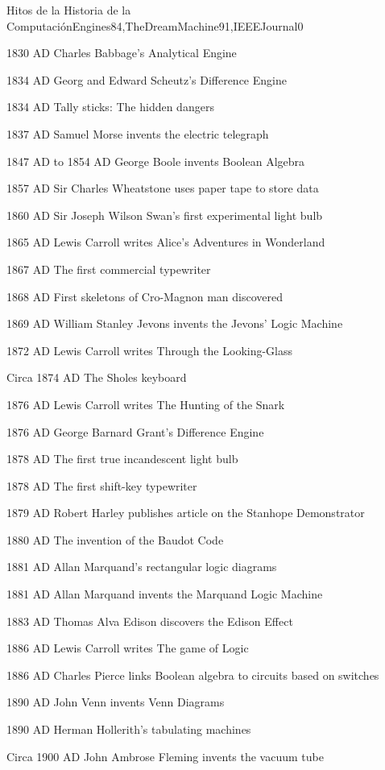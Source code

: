 \begin{syllabus}
\begin{unit}{Hitos de la Historia de la Computación}{Engines84,TheDreamMachine91,IEEEJournal}{0}
\begin{topics}
	\item 1830 AD Charles Babbage's Analytical Engine
	\item 1834 AD Georg and Edward Scheutz's Difference Engine
	\item 1834 AD Tally sticks: The hidden dangers
	\item 1837 AD Samuel Morse invents the electric telegraph
	\item 1847 AD to 1854 AD George Boole invents Boolean Algebra
	\item 1857 AD Sir Charles Wheatstone uses paper tape to store data
	\item 1860 AD Sir Joseph Wilson Swan's first experimental light bulb
	\item 1865 AD Lewis Carroll writes Alice's Adventures in Wonderland
	\item 1867 AD The first commercial typewriter
	\item 1868 AD First skeletons of Cro-Magnon man discovered
	\item 1869 AD William Stanley Jevons invents the Jevons' Logic Machine
	\item 1872 AD Lewis Carroll writes Through the Looking-Glass
	\item Circa 1874 AD The Sholes keyboard
	\item 1876 AD Lewis Carroll writes The Hunting of the Snark
	\item 1876 AD George Barnard Grant's Difference Engine
	\item 1878 AD The first true incandescent light bulb
	\item 1878 AD The first shift-key typewriter
	\item 1879 AD Robert Harley publishes article on the Stanhope Demonstrator
	\item 1880 AD The invention of the Baudot Code
	\item 1881 AD Allan Marquand's rectangular logic diagrams
	\item 1881 AD Allan Marquand invents the Marquand Logic Machine
	\item 1883 AD Thomas Alva Edison discovers the Edison Effect
	\item 1886 AD Lewis Carroll writes The game of Logic
	\item 1886 AD Charles Pierce links Boolean algebra to circuits based on switches
	\item 1890 AD John Venn invents Venn Diagrams
	\item 1890 AD Herman Hollerith's tabulating machines
	\item Circa 1900 AD John Ambrose Fleming invents the vacuum tube

\end{topics}
\end{unit}
\end{syllabus}
